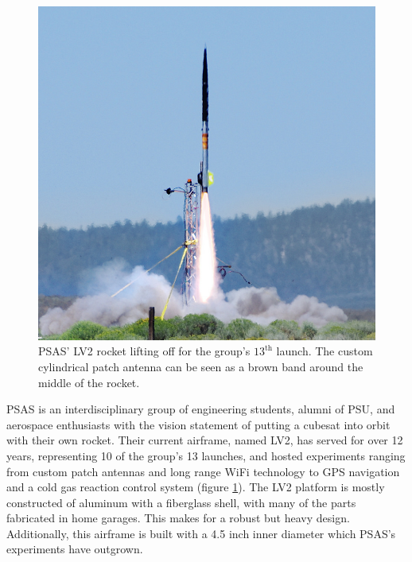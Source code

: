\documentclass{aiaa-tc}%
\begin{document}
\begin{figure}
\centering
\includegraphics[width=\linewidth]{../img/L12-cropped.png}
\caption{PSAS' LV2 rocket lifting off for the group's $13^\text{th}$ launch. The custom cylindrical patch antenna can be seen as a brown band around the middle of the rocket.}
\label{fig:L-12}
\end{figure}

PSAS  is an interdisciplinary group of engineering students, alumni of PSU, and aerospace enthusiasts with the vision statement of putting a cubesat into orbit with their own rocket. 
Their current airframe, named LV2, has served for over 12 years, representing 10 of the group's 13 launches, and hosted experiments ranging from custom patch antennas and long range WiFi technology to GPS navigation and a cold gas reaction control system (figure \ref{fig:L-12}). The LV2 platform is mostly constructed of aluminum with a fiberglass shell, with many of the parts fabricated in home garages. This makes for a robust but heavy design. Additionally, this airframe is built with a 4.5 inch inner diameter which PSAS's experiments have outgrown. 
\end{document}
